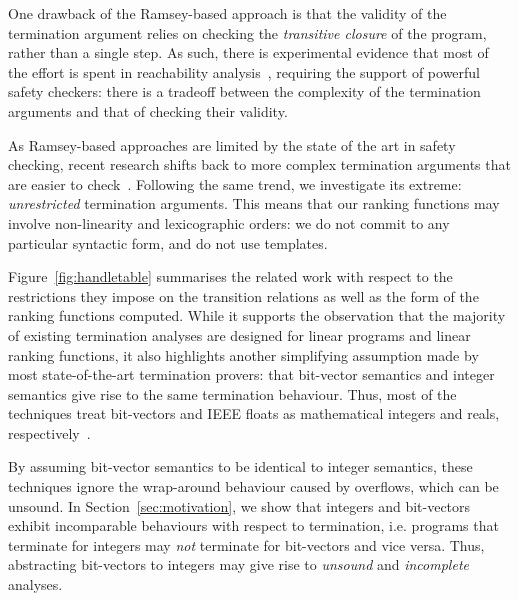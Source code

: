 \documentclass[preprint]{sigplanconf}
\theoremstyle{definition}
\begin{document}

One drawback of the Ramsey-based approach is that the validity of the
termination argument relies on checking the \emph{transitive closure} of the
program, rather than a single step.  As such, there is experimental evidence
that most of the effort is spent in reachability
analysis~\cite{DBLP:conf/pldi/CookPR06,DBLP:conf/cav/KroeningSTW10},
requiring the support of powerful safety checkers: there is a tradeoff
between the complexity of the termination arguments and that of checking
their validity.

As Ramsey-based approaches are limited by the state of the art in safety
checking, recent research shifts back to more complex termination arguments
that are easier to
check~\cite{DBLP:conf/cav/KroeningSTW10,DBLP:conf/tacas/CookSZ13,DBLP:conf/cav/HeizmannHP14}. 
Following the same trend, we investigate its extreme: \emph{unrestricted}
termination arguments.  This means that our ranking functions may involve
non-linearity and lexicographic orders: we do not commit to any particular
syntactic form, and do not use templates.

Figure~\ref{fig:handletable} summarises the related work with respect to the
restrictions they impose on the transition relations as well as the form of
the ranking functions computed.  While it supports the observation that the
majority of existing termination analyses are designed for linear programs
and linear ranking functions, it also highlights another simplifying
assumption made by most state-of-the-art termination provers: that
bit-vector semantics and integer semantics give rise to the same termination
behaviour.  Thus, most of the techniques treat bit-vectors and IEEE floats
as mathematical integers and reals,
respectively~\cite{DBLP:conf/pldi/CookPR06,DBLP:conf/popl/Ben-AmramG13,DBLP:conf/vmcai/P04,DBLP:conf/atva/HeizmannHLP13,DBLP:conf/vmcai/BradleyMS05,DBLP:conf/cav/KroeningSTW10}.

By assuming bit-vector semantics to be identical to integer semantics, these
techniques ignore the wrap-around behaviour caused by overflows, which can
be unsound.  In Section~\ref{sec:motivation}, we show that integers and
bit-vectors exhibit incomparable behaviours with respect to termination,
i.e.  programs that terminate for integers may \emph{not} terminate for
bit-vectors and vice versa.  Thus, abstracting bit-vectors to integers may
give rise to {\em unsound} and {\em incomplete} analyses.
\end{document}
